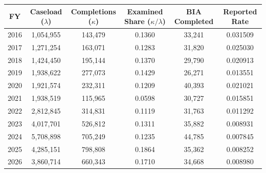\begin{tabular}{cccccc}
\hline
\textbf{FY} & \textbf{Caseload ($\lambda$)} & \textbf{Completions ($\kappa$)} & \textbf{Examined Share ($\kappa/\lambda$)} & \textbf{BIA Completed} & \textbf{Reported Rate} \\
\hline
2016 & 1,054,955 & 143,479 & 0.1360 & 33,241 & 0.031509 \\
2017 & 1,271,254 & 163,071 & 0.1283 & 31,820 & 0.025030 \\
2018 & 1,424,450 & 195,144 & 0.1370 & 29,790 & 0.020913 \\
2019 & 1,938,622 & 277,073 & 0.1429 & 26,271 & 0.013551 \\
2020 & 1,921,574 & 232,311 & 0.1209 & 40,393 & 0.021021 \\
2021 & 1,938,519 & 115,965 & 0.0598 & 30,727 & 0.015851 \\
2022 & 2,812,845 & 314,831 & 0.1119 & 31,763 & 0.011292 \\
2023 & 4,017,701 & 526,812 & 0.1311 & 35,882 & 0.008931 \\
2024 & 5,708,898 & 705,249 & 0.1235 & 44,785 & 0.007845 \\
2025 & 4,285,151 & 798,808 & 0.1864 & 35,362 & 0.008252 \\
2026 & 3,860,714 & 660,343 & 0.1710 & 34,668 & 0.008980 \\
\hline
\end{tabular}
